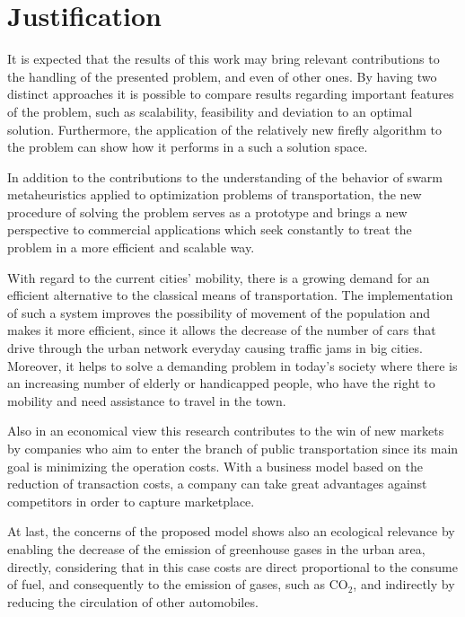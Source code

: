 \documentclass[tuberlin,cic,tc,openright,english,noabntcite,oneside]{iiufrgs}
\begin{document}
\section{Justification}
It is expected that the results of this work may bring relevant contributions to the handling of the presented problem, and even of other ones. By having two distinct approaches it is possible to compare results regarding important features of the problem, such as scalability, feasibility and deviation to an optimal solution. Furthermore, the application of the relatively new firefly algorithm to the problem can show how it performs in a such a solution space.

In addition to the contributions to the understanding of the behavior of swarm metaheuristics applied to optimization problems of transportation, the new procedure of solving the problem serves as a prototype and brings a new perspective to commercial applications which seek constantly to treat the problem in a more efficient and scalable way.

With regard to the current cities' mobility, there is a growing demand for an efficient alternative to the classical means of transportation. The implementation of such a system improves the possibility of movement of the population and makes it more efficient, since it allows the decrease of the number of cars that drive through the urban network everyday causing traffic jams in big cities. Moreover, it helps to solve a demanding problem in today's society where there is an increasing number of elderly or handicapped people, who have the right to mobility and need assistance to travel in the town.

Also in an economical view this research contributes to the win of new markets by companies who aim to enter the branch of public transportation since its main goal is minimizing the operation costs. With a business model based on the reduction of transaction costs, a company can take great advantages against competitors in order to capture marketplace.

At last, the concerns of the proposed model shows also an ecological relevance by enabling the decrease of the emission of greenhouse gases in the urban area, directly, considering that in this case costs are direct proportional to the consume of fuel, and consequently to the emission of gases, such as CO$_{2}$, and indirectly by reducing the circulation of other automobiles.

\end{document}
